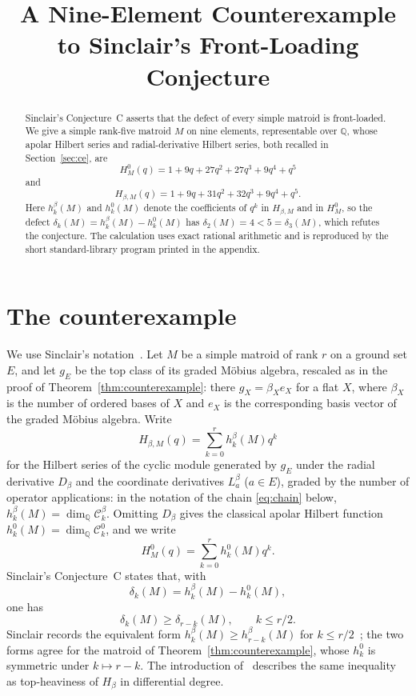 \documentclass[11pt]{amsart}
\title[A counterexample to front-loading]
{A Nine-Element Counterexample to Sinclair's Front-Loading Conjecture}
\date{}
\theoremstyle{remark}
\begin{document}
\begin{abstract}
Sinclair's Conjecture~C asserts that the defect of every simple matroid is
front-loaded. We give a simple rank-five matroid $M$ on nine elements,
representable over $\mathbb Q$, whose apolar Hilbert series and
radial-derivative Hilbert series, both recalled in Section~\ref{sec:ce}, are
\[
H_M^0(q)=1+9q+27q^2+27q^3+9q^4+q^5
\]
and
\[
H_{\beta,M}(q)=1+9q+31q^2+32q^3+9q^4+q^5.
\]
Here $h_k^\beta(M)$ and $h_k^0(M)$ denote the coefficients of $q^k$ in
$H_{\beta,M}$ and in $H_M^0$, so the defect $\delta_k(M)=h_k^\beta(M)-h_k^0(M)$
has $\delta_2(M)=4<5=\delta_3(M)$, which refutes the conjecture. The calculation
uses exact rational arithmetic and is reproduced by the short
standard-library program printed in the appendix.
\end{abstract}

\maketitle

\section{The counterexample}\label{sec:ce}

We use Sinclair's notation~\cite{Sinclair}. Let $M$ be a simple matroid of
rank $r$ on a ground set $E$, and let $g_E$ be the top class of its graded
M\"obius algebra, rescaled as in the proof of
Theorem~\ref{thm:counterexample}: there $g_X=\beta_Xe_X$ for a flat $X$, where
$\beta_X$ is the number of ordered bases of $X$ and $e_X$ is the corresponding
basis vector of the graded M\"obius algebra. Write
\[
H_{\beta,M}(q)=\sum_{k=0}^r h_k^\beta(M)q^k
\]
for the Hilbert series of the cyclic module generated by $g_E$ under the
radial derivative $D_\beta$ and the coordinate derivatives $L_a^\beta$
($a\in E$), graded by the number of operator applications: in the notation of
the chain \eqref{eq:chain} below, $h_k^\beta(M)=\dim_{\mathbb Q}\mathcal
C_k^\beta$. Omitting $D_\beta$ gives the classical apolar Hilbert function
$h_k^0(M)=\dim_{\mathbb Q}\mathcal C_k^0$, and we write
\[
H_M^0(q)=\sum_{k=0}^r h_k^0(M)q^k.
\]
Sinclair's Conjecture~C states that, with
\[
\delta_k(M)=h_k^\beta(M)-h_k^0(M),
\]
one has
\[
\delta_k(M)\geq \delta_{r-k}(M),\qquad k\leq r/2.
\]
Sinclair records the equivalent form $h_k^\beta(M)\geq h_{r-k}^\beta(M)$ for
$k\leq r/2$~\cite{Sinclair}; the two forms agree for the matroid of
Theorem~\ref{thm:counterexample}, whose $h_k^0$ is symmetric under $k\mapsto
r-k$. The introduction of~\cite{Sinclair} describes the same inequality as
top-heaviness of $H_\beta$ in differential degree.
\end{document}
